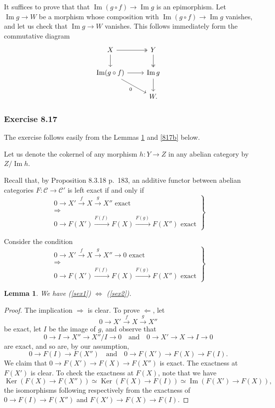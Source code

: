 \documentclass[12pt]{article}
\newtheorem{lem}[thm]{Lemma}
\theoremstyle{remark}
\theoremstyle{definition}
\newcommand{\C}{\mathcal C}
\newcommand{\then}{\Rightarrow}
\newcommand{\si}{\Leftarrow}
\newcommand{\ssi}{\Leftrightarrow}%
\DeclareMathOperator{\Ima}{Im}
\DeclareMathOperator{\Ker}{Ker}
\begin{document}
It suffices to prove that that $\Ima(g\circ f)\to\Ima g$ is an epimorphism. Let $\Ima g\to W$ be a morphism whose composition with $\Ima(g\circ f)\to\Ima g$ vanishes, and let us check that $\Ima g\to W$ vanishes. This follows immediately form the commutative diagram 
$$
\begin{tikzcd}
X\ar{d}\ar[two heads]{r}&Y\ar[two heads]{d}\\ 
\Ima(g\circ f)\ar{dr}[swap]{0}\ar{r}&\Ima g\ar{d}\\ 
{}&W.
\end{tikzcd}
$$
%
%
\subsubsection{Exercise 8.17}
%
The exercise follows easily from the Lemmas \ref{817a} and \ref{817b} below.

Let us denote the cokernel of any morphism $h:Y\to Z$ in any abelian category by $Z/\Ima h$. 

Recall that, by Proposition 8.3.18 p.~183, an additive functor between abelian categories $F:\C\to\C'$ is left exact if and only if
%
\begin{equation}\label{sex1}
\left.
\begin{matrix}
0\to X'\overset{f}{\to}X\overset{g}{\to}X''\text{ exact }\\ 
\then\\ 
0\to F(X')\overset{F(f)\ }{\longrightarrow}F(X)\overset{F(g)\ }{\longrightarrow}F(X'')\text{ exact}
\end{matrix}
\right\}
\end{equation}

Consider the condition
%
\begin{equation}\label{sex2}
\left.
\begin{matrix}
0\to X'\overset{f}{\to}X\overset{g}{\to}X''\to0\text{ exact }\\ 
\then\\ 
0\to F(X')\overset{F(f)\ }{\longrightarrow}F(X)\overset{F(g)\ }{\longrightarrow}F(X'')\text{ exact}
\end{matrix}
\right\}
\end{equation}
%
\begin{lem}\label{817a}
We have (\ref{sex1}) $\ssi$ (\ref{sex2}). 
\end{lem}
%
\begin{proof}
The implication $\then$ is clear. To prove $\si$, let 
$$
0\to X'\overset{f}{\to}X\overset{g}{\to}X''
$$
be exact, let $I$ be the image of $g$, and observe that 
$$
0\to I\to X''\to X''/I\to0\quad\text{and}\quad0\to X'\to X\to I\to0
$$ 
are exact, and so are, by our assumption, 
$$
0\to F(I)\to F(X'')\quad\text{and}\quad0\to F(X')\to F(X)\to F(I).
$$ 
We claim that $0\to F(X')\to F(X)\to F(X'')$ is exact. The exactness at $F(X')$ is clear. To check the exactness at $F(X)$, note that we have 
$$
\Ker(F(X)\to F(X''))\simeq\Ker(F(X)\to F(I))\simeq\Ima(F(X')\to F(X)),
$$ 
the isomorphisms following respectively from the exactness of $0\to F(I)\to F(X'')$ and $F(X')\to F(X)\to F(I)$.
\end{proof}
\end{document}
